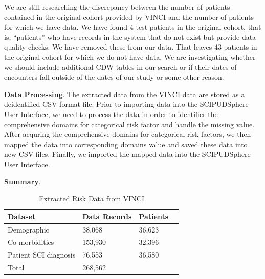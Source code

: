\documentclass{amia}
\begin{document}
We are still researching the discrepancy between the number of patients contained in the original cohort provided by VINCI and the number of patients for which we have data.  We have found 4 test patients in the original cohort, that is, ``patients'' who have records in the system that do not exist but provide data quality checks.  We have removed these from our data.  That leaves 43 patients in the original cohort for which we do not have data.  We are investigating whether we should include additional CDW tables in our search or if their dates of encounters fall outside of the dates of our study or some other reason.

{\bf Data Processing}. The extracted data from the VINCI data are stored as a deidentified CSV format file. Prior to importing data into the SCIPUDSphere User Interface, we need to process the data in order to identifier the comprehensive domains for categorical risk factor and handle the missing value. After acquring the comprehensive domains for categorical risk factors, we then mapped the data into corresponding domains value and saved these data into new CSV files. Finally, we imported the mapped data into the SCIPUDSphere User Interface.

{\bf Summary}.

\begin{table}[!ht]
\centering
\caption{Extracted Risk Data from VINCI}
  \begin{tabular}{|l|l|l|l|}
  \hline
    \textbf{Dataset}  & \textbf{Data Records} & \textbf{Patients} \\ \hline
    Demographic            &  38,068  & 36,623 \\ \hline
    Co-morbidities         & 153,930  & 32,396 \\ \hline
    Patient SCI diagnosis  &  76,553  & 36,580 \\ \hline
    Total & 268,562 \\ \hline
  \end{tabular}
\end{table}
\end{document}
